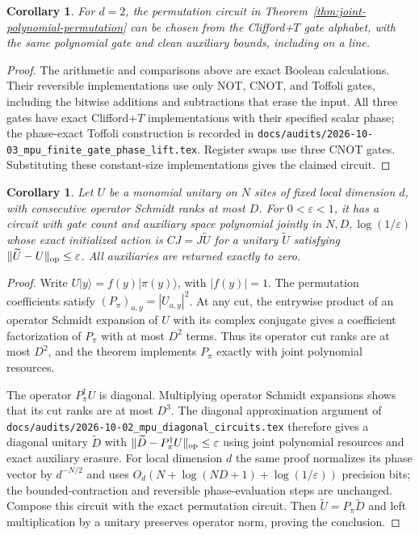 \documentclass[11pt]{article}
\newtheorem{corollary}[theorem]{Corollary}
\begin{document}
\begin{corollary}\label{cor:joint-polynomial-qubit-permutation}
For $d=2$, the permutation circuit in
Theorem~\ref{thm:joint-polynomial-permutation} can be chosen
from the Clifford+$T$ gate alphabet, with the same polynomial
gate and clean auxiliary bounds, including on a line.
\end{corollary}

\begin{proof}
The arithmetic and comparisons above are exact Boolean
calculations. Their reversible implementations use only
NOT, CNOT, and Toffoli gates, including the bitwise additions
and subtractions that erase the input. All three gates have
exact Clifford+$T$ implementations with their specified scalar
phase; the phase-exact Toffoli construction is recorded in
\nolinkurl{docs/audits/2026-10-03_mpu_finite_gate_phase_lift.tex}.
Register swaps use three CNOT gates. Substituting these
constant-size implementations gives the claimed circuit.
\end{proof}

\begin{corollary}\label{cor:joint-polynomial-monomial}
Let $U$ be a monomial unitary on $N$ sites of fixed local
dimension $d$, with consecutive operator Schmidt ranks at
most $D$. For $0<\varepsilon<1$, it has a circuit with gate
count and auxiliary space polynomial jointly in
$N,D,\log(1/\varepsilon)$ whose exact initialized action is
$CJ=J\widetilde U$ for a unitary $\widetilde U$ satisfying
$\|\widetilde U-U\|_{\rm op}\le\varepsilon$.
All auxiliaries are returned exactly to zero.
\end{corollary}

\begin{proof}
Write $U|y\rangle=f(y)|\pi(y)\rangle$, with $|f(y)|=1$.
The permutation coefficients satisfy
$(P_\pi)_{a,y}=|U_{a,y}|^2$.
At any cut, the entrywise product of an operator Schmidt
expansion of $U$ with its complex conjugate gives a coefficient
factorization of $P_\pi$ with at most $D^2$ terms.
Thus its operator cut ranks are at most $D^2$, and the theorem
implements $P_\pi$ exactly with joint polynomial resources.

The operator $P_\pi^\dagger U$ is diagonal. Multiplying
operator Schmidt expansions shows that its cut ranks are at
most $D^3$. The diagonal approximation argument of
\nolinkurl{docs/audits/2026-10-02_mpu_diagonal_circuits.tex}
therefore gives a diagonal unitary $\widetilde D$ with
$\|\widetilde D-P_\pi^\dagger U\|_{\rm op}\le\varepsilon$
using joint polynomial resources and exact auxiliary erasure.
For local dimension $d$ the same proof normalizes its phase
vector by $d^{-N/2}$ and uses
$O_d(N+\log(ND+1)+\log(1/\varepsilon))$ precision bits;
the bounded-contraction and reversible phase-evaluation
steps are unchanged.
Compose this circuit with the exact permutation circuit.
Then $\widetilde U=P_\pi\widetilde D$ and left multiplication
by a unitary preserves operator norm, proving the conclusion.
\end{proof}
\end{document}
